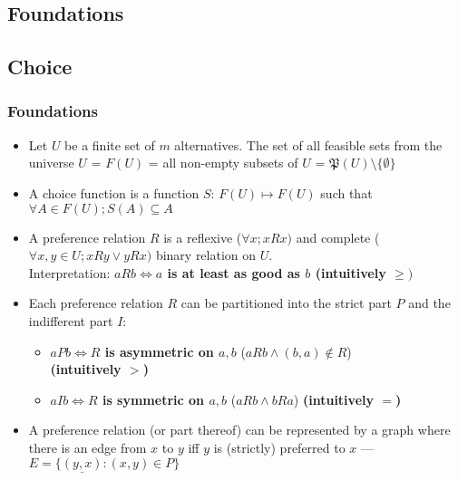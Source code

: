 \documentclass[20pt,a4paper,landscape]{extarticle}
\begin{document}
\tableofcontents
\clearpage
\begin{flushleft}
\section{Foundations}
\subsection{Choice}
\subsubsection{Foundations}
\begin{itemize}
\item Let $U$ be a finite set of $m$ alternatives. The set of all feasible sets from the universe $U$ = $F(U)$  = all non-empty subsets of $U$ = $\mathfrak{P}(U)\setminus\{\emptyset\}$
\item{A choice function is a function $S$: $F(U) \mapsto F(U)$ such that $\forall A \in F(U); S(A) \subseteq A$}
\clearpage
\item{A preference relation $R$ is a reflexive ($\forall x; xRx)$ and complete ($\forall x,y \in U; xRy \lor yRx)$ binary relation on $U$.\\
Interpretation: \textbf{$aRb \Leftrightarrow a$ is at least as good as $b$ (intuitively $\geq)$}}
\item{Each preference relation $R$ can be partitioned into the strict part $P$ and the indifferent part $I$:}
\begin{itemize}
    \item \textbf{$aPb \Leftrightarrow R$ is asymmetric on $a, b$} ($aRb \land (b,a) \notin R$)\\
    \textbf{(intuitively $>$)}
    \item \textbf{$aIb \Leftrightarrow R$ is symmetric on $a, b$} ($aRb \land bRa$) \textbf{(intuitively $=$)}
\end{itemize}
\item A preference relation (or part thereof) can be represented by a graph where there is an edge from $x$ to $y$ iff $y$ is (strictly) preferred to $x$ --- $E=\{\underline{(y, x)}: (x, y) \in P\}$
\end{itemize}
\clearpage

\end{flushleft}
\end{document}
